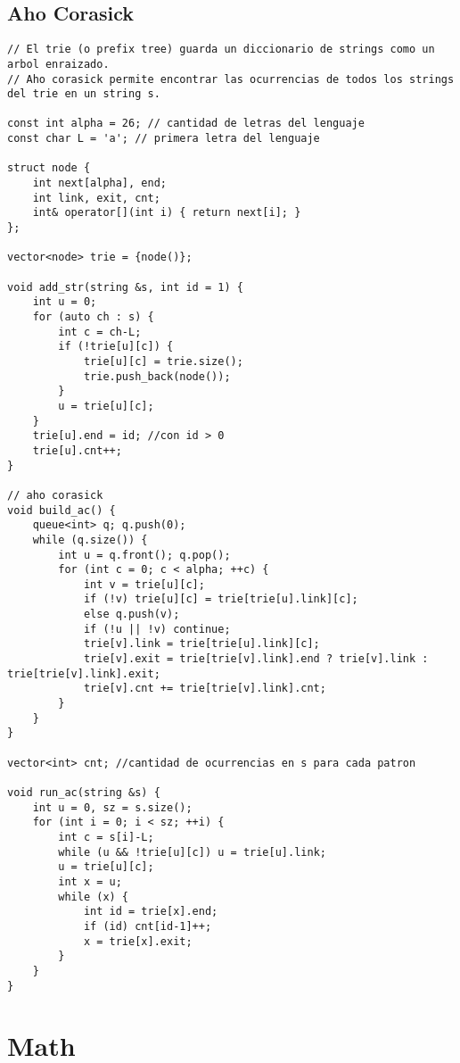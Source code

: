 \documentclass[10pt,letterpaper,twocolumn,twosided]{article}
\begin{document}
\subsection{Aho Corasick}
\begin{lstlisting}
// El trie (o prefix tree) guarda un diccionario de strings como un arbol enraizado.
// Aho corasick permite encontrar las ocurrencias de todos los strings del trie en un string s.

const int alpha = 26; // cantidad de letras del lenguaje
const char L = 'a'; // primera letra del lenguaje

struct node {
    int next[alpha], end;
    int link, exit, cnt;
    int& operator[](int i) { return next[i]; }
};

vector<node> trie = {node()};

void add_str(string &s, int id = 1) {
    int u = 0;
    for (auto ch : s) {
        int c = ch-L;
        if (!trie[u][c]) {
            trie[u][c] = trie.size();
            trie.push_back(node());
        }
        u = trie[u][c];
    }
    trie[u].end = id; //con id > 0
    trie[u].cnt++;
}

// aho corasick
void build_ac() {
    queue<int> q; q.push(0);
    while (q.size()) {
        int u = q.front(); q.pop();
        for (int c = 0; c < alpha; ++c) {
            int v = trie[u][c];
            if (!v) trie[u][c] = trie[trie[u].link][c];
            else q.push(v);
            if (!u || !v) continue;
            trie[v].link = trie[trie[u].link][c];
			trie[v].exit = trie[trie[v].link].end ? trie[v].link : trie[trie[v].link].exit;
            trie[v].cnt += trie[trie[v].link].cnt;
        }
    }
}

vector<int> cnt; //cantidad de ocurrencias en s para cada patron

void run_ac(string &s) {
    int u = 0, sz = s.size();
    for (int i = 0; i < sz; ++i) {
        int c = s[i]-L;
        while (u && !trie[u][c]) u = trie[u].link;
        u = trie[u][c];
        int x = u;
        while (x) {
            int id = trie[x].end;
            if (id) cnt[id-1]++;
            x = trie[x].exit;
        }
    }
}
\end{lstlisting}


\section{Math}
\end{document}
